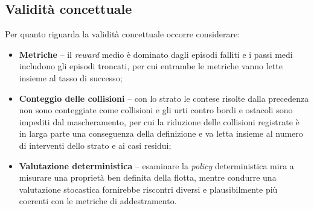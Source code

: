 \documentclass[12pt,a4paper,twoside]{report}
\begin{document}
\subsection{Validità concettuale}
Per quanto riguarda la validità concettuale occorre considerare:
\begin{itemize}
    \item \textbf{Metriche} -- il \emph{reward} medio è dominato dagli episodi falliti e i passi medi includono gli episodi troncati, per cui entrambe le metriche vanno lette insieme al tasso di successo;
    \item \textbf{Conteggio delle collisioni} -- con lo strato le contese risolte dalla precedenza non sono conteggiate come collisioni e gli urti contro bordi e ostacoli sono impediti dal mascheramento, per cui la riduzione delle collisioni registrate è in larga parte una conseguenza della definizione e va letta insieme al numero di interventi dello strato e ai casi residui;
    \item \textbf{Valutazione deterministica} -- esaminare la \emph{policy} deterministica mira a misurare una proprietà ben definita della flotta, mentre condurre una valutazione stocastica fornirebbe riscontri diversi e plausibilmente più coerenti con le metriche di addestramento.
\end{itemize}
\end{document}
